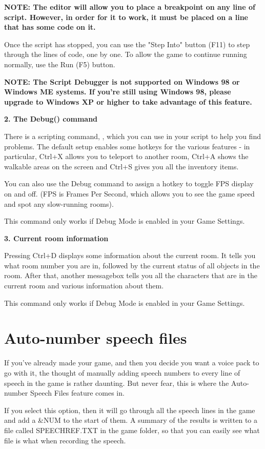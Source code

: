 \bf{NOTE:} The editor will allow you to place a breakpoint on any line of script.
However, in order for it to work, it must be placed on a line that has some code on it.

Once the script has stopped, you can use the "Step Into" button (F11) to step through
the lines of code, one by one. To allow the game to continue running normally, use the Run (F5) button.

\bf{NOTE:} The Script Debugger is not supported on Windows 98 or Windows ME systems.
If you're still using Windows 98, please upgrade to Windows XP or higher to take advantage
of this feature.

\bf{2. The Debug() command}

There is a scripting command, , which you can use in your script
to help you find problems. The default setup enables some hotkeys for the various features -
in particular, Ctrl+X allows you to teleport to another room, Ctrl+A shows the walkable
areas on the screen and Ctrl+S gives you all the inventory items.

You can also use the Debug command to assign a hotkey to toggle FPS display on and off.
(FPS is Frames Per Second, which allows you to see the game speed and spot any slow-running
rooms).

This command only works if Debug Mode is enabled in your Game Settings.

\bf{3. Current room information}

Pressing Ctrl+D displays some information about the current room. It tells you what
room number you are in, followed by the current status of all objects in the room. After that,
another messagebox tells you all the characters that are in the current room and various
information about them.

This command only works if Debug Mode is enabled in your Game Settings.


\section{Auto-number speech files}%

If you've already made your game, and then you decide you want a voice pack to go with it,
the thought of manually adding speech numbers to every line of speech in the game is rather
daunting. But never fear, this is where the Auto-number Speech Files feature comes in.

If you select this option, then it will go through all the speech lines in the game and
add a &NUM to the start of them. A summary of the results is written to a file called
SPEECHREF.TXT in the game folder, so that you can easily see what file is what when
recording the speech.

